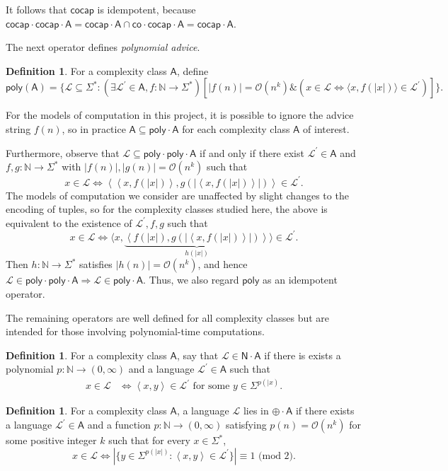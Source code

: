 \documentclass[12pt]{article}
\theoremstyle{definition}
\newtheorem{definition}[theorem]{Definition}
\theoremstyle{remark}
\newcommand{\N}{\mathbb{N}}
\newcommand{\ra}{\rightarrow}
\newcommand{\cL}{\mathcal{L}}
\newcommand{\A}{\mathsf{A}}
\newcommand{\co}{\mathsf{co}}
\newcommand{\cocap}{\mathsf{cocap}}
\newcommand{\poly}{\mathsf{poly}}
\newcommand{\msf}[1]{\mathsf{#1}}
\newcommand{\AND}{\mathbin{\&}}
\newcommand{\Oh}{\mathcal{O}}
\newcommand{\inner}[1]{\left\langle#1\right\rangle}
\begin{document}
It follows that $\cocap$ is idempotent, because
$\cocap\cdot\cocap\cdot\A=\cocap\cdot\A\cap\co\cdot\cocap\cdot\A=\cocap\cdot\A$.

The next operator defines \textit{polynomial advice}.

\begin{definition}
For a complexity class $\A$, define
\[
\poly(\A)=\{\cL\subseteq\Sigma^*:(\exists\cL^\prime\in\A, f:\N\ra\Sigma^*)
[|f(n)|=\Oh(n^k)\AND(x\in\cL\Leftrightarrow\langle
x,f(|x|)\rangle\in\cL^\prime)]\}.
\]
\end{definition}
For the models of computation in this project, it is possible to ignore the
advice string $f(n)$, so in practice $\A\subseteq\poly\cdot\A$ for each
complexity class $\A$ of interest.

Furthermore, observe that $\cL\subseteq\poly\cdot\poly\cdot\A$ if and only if
there exist $\cL^\prime\in\A$ and $f,g:\N\ra\Sigma^*$ with
$|f(n)|,|g(n)|=\Oh(n^k)$ such that
\[
x\in\cL\Longleftrightarrow
\inner{\inner{x,f(|x|)},g(|\inner{x,f(|x|)}|)}\in\cL^\prime.
\]
The models of computation we consider are unaffected by slight changes to the
encoding of tuples, so for the complexity classes studied here, the above is
equivalent to the existence of $\cL^\prime,f,g$ such that
\[
x\in\cL\Longleftrightarrow
\langle x,
\underbrace{\inner{f(|x|),g(|\inner{x,f(|x|)}|)}}_{h(|x|)}\rangle\in\cL^\prime.
\]
Then $h:\N\ra\Sigma^*$ satisfies $|h(n)|=\Oh(n^k)$, and hence
$\cL\in\poly\cdot\poly\cdot\A\Rightarrow\cL\in\poly\cdot\A$. Thus, we also
regard $\poly$ as an idempotent operator.

The remaining operators are well defined for all complexity classes but are
intended for those involving polynomial-time computations.

\begin{definition}
For a complexity class $\A$, say that $\cL\in\msf{N}\cdot\A$ if there is exists a
polynomial $p:\N\ra(0,\infty)$ and a language $\cL^\prime\in\A$ such that
\begin{align*}
x\in\cL&\Longleftrightarrow\inner{x,y}\in\cL^\prime\text{ for some }y
\in\Sigma^{p(|x)}.
\end{align*}
\end{definition}

\begin{definition}
For a complexity class $\A$, a language $\cL$ lies in $\oplus\cdot\A$ if there
exists a language $\cL^\prime\in\A$ and a function $p:\N\ra(0,\infty)$
satisfying $p(n)=\Oh(n^k)$ for some positive integer $k$ such that for every
$x\in\Sigma^*$,
\[
x\in\cL\Longleftrightarrow|\{y\in\Sigma^{p(|x|)}:\inner{x,y}\in\cL^\prime\}|
\equiv 1\text{ (mod 2)}.
\]
\end{definition}
\end{document}
